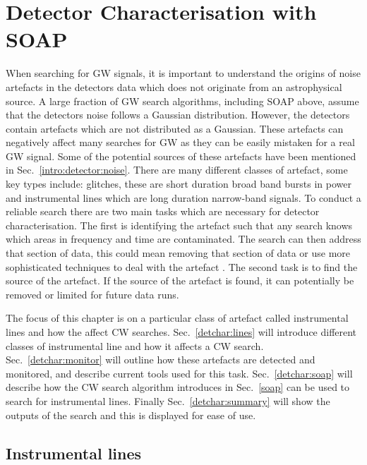 \chapter{\label{detchar}Detector Characterisation with SOAP}

When searching for \ac{GW} signals, it is important to understand the origins of noise artefacts in the detectors data which does not originate from an astrophysical source.
A large fraction of \ac{GW} search algorithms, including SOAP above, assume that the detectors noise follows a Gaussian distribution.
However, the detectors contain artefacts which are not distributed as a Gaussian. 
These artefacts can negatively affect many searches for \ac{GW} as they can be easily mistaken for a real \ac{GW} signal.
Some of the potential sources of these artefacts have been mentioned in Sec.~\ref{intro:detector:noise}. 
There are many different classes of artefact, some key types include: glitches, these are short duration broad band bursts in power and instrumental lines which are long duration narrow-band signals.
To conduct a reliable search there are two main tasks which are necessary for detector characterisation.
The first is identifying the artefact such that any search knows which areas in frequency and time are contaminated.
The search can then address that section of data, this could mean removing that section of data or use more sophisticated techniques to deal with the artefact \citep{}.
The second task is to find the source of the artefact. 
If the source of the artefact is found, it can potentially be removed or limited for future data runs.

The focus of this chapter is on a particular class of artefact called instrumental lines and how the affect \ac{CW} searches.
Sec.~\ref{detchar:lines} will introduce different classes of instrumental line and how it affects a \ac{CW} search.
Sec.~\ref{detchar:monitor} will outline how these artefacts are detected and monitored, and describe current tools used for this task.
Sec.~\ref{detchar:soap} will describe how the \ac{CW} search algorithm introduces in Sec.~\ref{soap} can be used to search for instrumental lines.
Finally Sec.~\ref{detchar:summary} will show the outputs of the search and this is displayed for ease of use.



\section{\label{detchar:lines}Instrumental lines}

